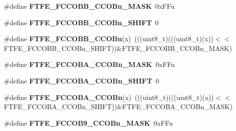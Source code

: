 \begin{DoxyCompactItemize}
\item 
\#define {\bfseries F\+T\+F\+E\+\_\+\+F\+C\+C\+O\+B\+B\+\_\+\+C\+C\+O\+Bn\+\_\+\+M\+A\+SK}~0x\+F\+Fu\hypertarget{group__FTFE__Register__Masks_ga0c4f10213e785664769dccd3f31c19d9}{}\label{group__FTFE__Register__Masks_ga0c4f10213e785664769dccd3f31c19d9}

\item 
\#define {\bfseries F\+T\+F\+E\+\_\+\+F\+C\+C\+O\+B\+B\+\_\+\+C\+C\+O\+Bn\+\_\+\+S\+H\+I\+FT}~0\hypertarget{group__FTFE__Register__Masks_ga486d3dca3c7da56602168363f9c474c2}{}\label{group__FTFE__Register__Masks_ga486d3dca3c7da56602168363f9c474c2}

\item 
\#define {\bfseries F\+T\+F\+E\+\_\+\+F\+C\+C\+O\+B\+B\+\_\+\+C\+C\+O\+Bn}(x)~(((uint8\+\_\+t)(((uint8\+\_\+t)(x))$<$$<$F\+T\+F\+E\+\_\+\+F\+C\+C\+O\+B\+B\+\_\+\+C\+C\+O\+Bn\+\_\+\+S\+H\+I\+FT))\&F\+T\+F\+E\+\_\+\+F\+C\+C\+O\+B\+B\+\_\+\+C\+C\+O\+Bn\+\_\+\+M\+A\+SK)\hypertarget{group__FTFE__Register__Masks_gab601b12b309d08fd70c8ac7ffb71a8a5}{}\label{group__FTFE__Register__Masks_gab601b12b309d08fd70c8ac7ffb71a8a5}

\item 
\#define {\bfseries F\+T\+F\+E\+\_\+\+F\+C\+C\+O\+B\+A\+\_\+\+C\+C\+O\+Bn\+\_\+\+M\+A\+SK}~0x\+F\+Fu\hypertarget{group__FTFE__Register__Masks_gacec52ac0397aa60e5278a27225d3506b}{}\label{group__FTFE__Register__Masks_gacec52ac0397aa60e5278a27225d3506b}

\item 
\#define {\bfseries F\+T\+F\+E\+\_\+\+F\+C\+C\+O\+B\+A\+\_\+\+C\+C\+O\+Bn\+\_\+\+S\+H\+I\+FT}~0\hypertarget{group__FTFE__Register__Masks_gadac1a605014d4879d27ac5a1b5707c5e}{}\label{group__FTFE__Register__Masks_gadac1a605014d4879d27ac5a1b5707c5e}

\item 
\#define {\bfseries F\+T\+F\+E\+\_\+\+F\+C\+C\+O\+B\+A\+\_\+\+C\+C\+O\+Bn}(x)~(((uint8\+\_\+t)(((uint8\+\_\+t)(x))$<$$<$F\+T\+F\+E\+\_\+\+F\+C\+C\+O\+B\+A\+\_\+\+C\+C\+O\+Bn\+\_\+\+S\+H\+I\+FT))\&F\+T\+F\+E\+\_\+\+F\+C\+C\+O\+B\+A\+\_\+\+C\+C\+O\+Bn\+\_\+\+M\+A\+SK)\hypertarget{group__FTFE__Register__Masks_ga39ad820ef25dff9352ef452ec48142e5}{}\label{group__FTFE__Register__Masks_ga39ad820ef25dff9352ef452ec48142e5}

\item 
\#define {\bfseries F\+T\+F\+E\+\_\+\+F\+C\+C\+O\+B9\+\_\+\+C\+C\+O\+Bn\+\_\+\+M\+A\+SK}~0x\+F\+Fu\hypertarget{group__FTFE__Register__Masks_ga6dd6be8d6e5ab42f88bc3864ff18988e}{}\label{group__FTFE__Register__Masks_ga6dd6be8d6e5ab42f88bc3864ff18988e}


\end{DoxyCompactItemize}
